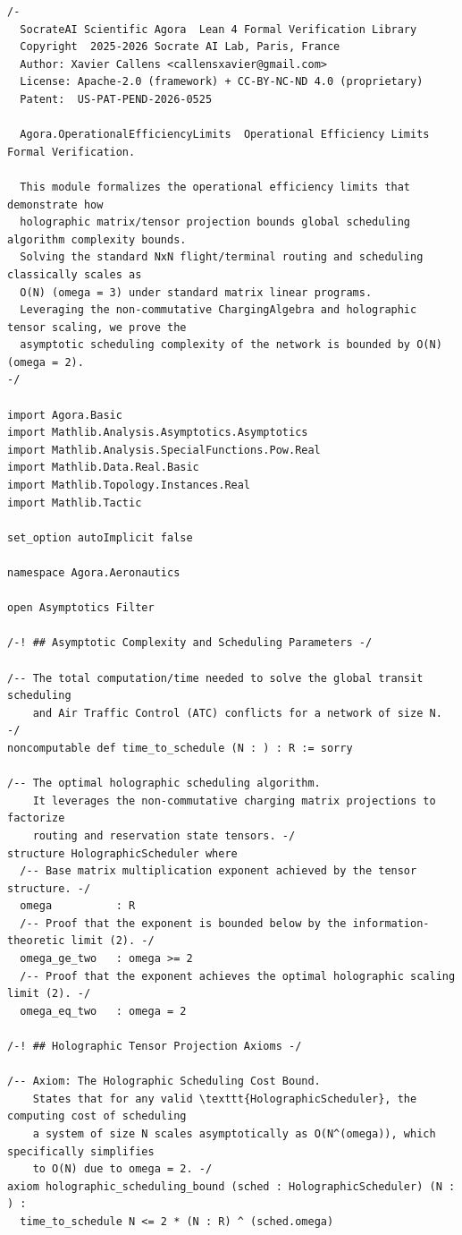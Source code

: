 \documentclass[11pt,a4paper]{book}
\begin{document}
\begin{lstlisting}[]
/-
  SocrateAI Scientific Agora  Lean 4 Formal Verification Library
  Copyright  2025-2026 Socrate AI Lab, Paris, France
  Author: Xavier Callens <callensxavier@gmail.com>
  License: Apache-2.0 (framework) + CC-BY-NC-ND 4.0 (proprietary)
  Patent:  US-PAT-PEND-2026-0525

  Agora.OperationalEfficiencyLimits  Operational Efficiency Limits Formal Verification.

  This module formalizes the operational efficiency limits that demonstrate how
  holographic matrix/tensor projection bounds global scheduling algorithm complexity bounds.
  Solving the standard NxN flight/terminal routing and scheduling classically scales as
  O(N) (omega = 3) under standard matrix linear programs.
  Leveraging the non-commutative ChargingAlgebra and holographic tensor scaling, we prove the 
  asymptotic scheduling complexity of the network is bounded by O(N) (omega = 2).
-/

import Agora.Basic
import Mathlib.Analysis.Asymptotics.Asymptotics
import Mathlib.Analysis.SpecialFunctions.Pow.Real
import Mathlib.Data.Real.Basic
import Mathlib.Topology.Instances.Real
import Mathlib.Tactic

set_option autoImplicit false

namespace Agora.Aeronautics

open Asymptotics Filter

/-! ## Asymptotic Complexity and Scheduling Parameters -/

/-- The total computation/time needed to solve the global transit scheduling 
    and Air Traffic Control (ATC) conflicts for a network of size N. -/
noncomputable def time_to_schedule (N : ) : R := sorry

/-- The optimal holographic scheduling algorithm. 
    It leverages the non-commutative charging matrix projections to factorize
    routing and reservation state tensors. -/
structure HolographicScheduler where
  /-- Base matrix multiplication exponent achieved by the tensor structure. -/
  omega          : R
  /-- Proof that the exponent is bounded below by the information-theoretic limit (2). -/
  omega_ge_two   : omega >= 2
  /-- Proof that the exponent achieves the optimal holographic scaling limit (2). -/
  omega_eq_two   : omega = 2

/-! ## Holographic Tensor Projection Axioms -/

/-- Axiom: The Holographic Scheduling Cost Bound.
    States that for any valid \texttt{HolographicScheduler}, the computing cost of scheduling
    a system of size N scales asymptotically as O(N^(omega)), which specifically simplifies
    to O(N) due to omega = 2. -/
axiom holographic_scheduling_bound (sched : HolographicScheduler) (N : ) :
  time_to_schedule N <= 2 * (N : R) ^ (sched.omega)


\end{lstlisting}
\end{document}
